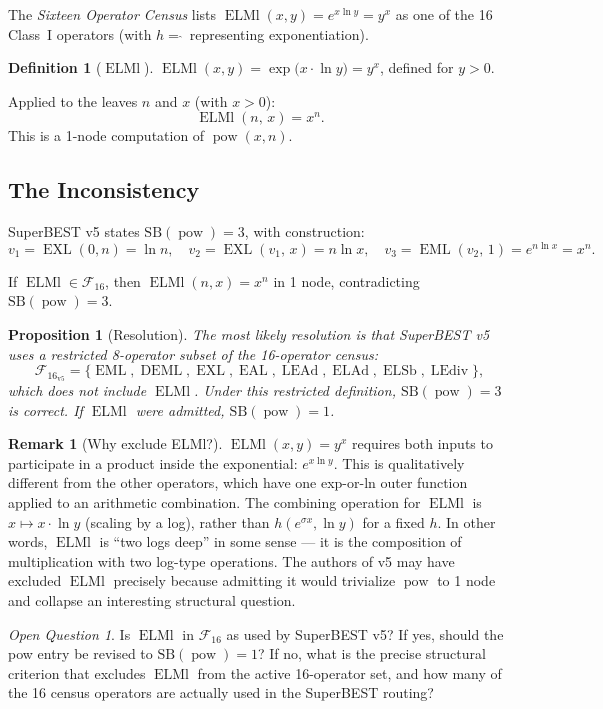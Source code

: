\documentclass[12pt,a4paper]{article}
\newtheorem{proposition}[theorem]{Proposition}
\theoremstyle{definition}
\newtheorem{definition}[theorem]{Definition}
\newtheorem{remark}[theorem]{Remark}
\theoremstyle{remark}
\newtheorem{openq}[theorem]{Open Question}
\newcommand{\EML}{\operatorname{EML}}
\newcommand{\EXL}{\operatorname{EXL}}
\newcommand{\EAL}{\operatorname{EAL}}
\newcommand{\DEML}{\operatorname{DEML}}
\newcommand{\ELAd}{\operatorname{ELAd}}
\newcommand{\ELSb}{\operatorname{ELSb}}
\newcommand{\ELMl}{\operatorname{ELMl}}
\newcommand{\LEAd}{\operatorname{LEAd}}
\newcommand{\LEdiv}{\operatorname{LEdiv}}
\newcommand{\powop}{\operatorname{pow}}
\newcommand{\SB}{\mathrm{SB}}
\newcommand{\F}{\mathcal{F}_{16}}
\begin{document}
The \emph{Sixteen Operator Census} \cite{Census} lists $\ELMl(x,y) = e^{x\ln y} = y^x$
as one of the 16 Class~I operators (with $h = \hat{}\,$ representing
exponentiation).

\begin{definition}[$\ELMl$]
$\ELMl(x,y) = \exp\!\bigl(x\cdot\ln y\bigr) = y^x$, defined for $y > 0$.
\end{definition}

Applied to the leaves $n$ and $x$ (with $x > 0$):
\[
  \ELMl(n,\,x) = x^n.
\]
This is a 1-node computation of $\powop(x,n)$.

\subsection{The Inconsistency}

SuperBEST v5 \cite{SBv5} states $\SB(\powop) = 3$, with construction:
\[
  v_1 = \EXL(0,n) = \ln n, \quad
  v_2 = \EXL(v_1,\,x) = n\ln x, \quad
  v_3 = \EML(v_2,\,1) = e^{n\ln x} = x^n.
\]

If $\ELMl\in\F$, then $\ELMl(n,x) = x^n$ in 1 node, contradicting $\SB(\powop) = 3$.

\begin{proposition}[Resolution]
\label{prop:elml-resolution}
The most likely resolution is that SuperBEST v5 uses a restricted
8-operator subset of the 16-operator census:
\[
  \F_{\mathrm{v5}} = \{\EML, \DEML, \EXL, \EAL, \LEAd, \ELAd, \ELSb, \LEdiv\},
\]
which does \emph{not} include $\ELMl$.
Under this restricted definition, $\SB(\powop) = 3$ is correct.
If $\ELMl$ were admitted, $\SB(\powop) = 1$.
\end{proposition}

\begin{remark}[Why exclude ELMl?]
$\ELMl(x,y) = y^x$ requires both inputs to participate in a product inside
the exponential: $e^{x\ln y}$.  This is qualitatively different from the
other operators, which have one exp-or-ln outer function applied to an
arithmetic combination.  The combining operation for $\ELMl$ is
$x\mapsto x\cdot\ln y$ (scaling by a log), rather than $h(e^{\sigma x}, \ln y)$
for a fixed $h$.  In other words, $\ELMl$ is ``two logs deep'' in some sense ---
it is the composition of multiplication with two log-type operations.
The authors of v5 may have excluded $\ELMl$ precisely because admitting it
would trivialize $\powop$ to 1 node and collapse an interesting structural question.
\end{remark}

\begin{openq}
Is $\ELMl$ in $\mathcal{F}_{16}$ as used by SuperBEST v5?
If yes, should the pow entry be revised to $\SB(\powop) = 1$?
If no, what is the precise structural criterion that excludes $\ELMl$
from the active 16-operator set, and how many of the 16 census operators
are actually used in the SuperBEST routing?
\end{openq}
\end{document}

